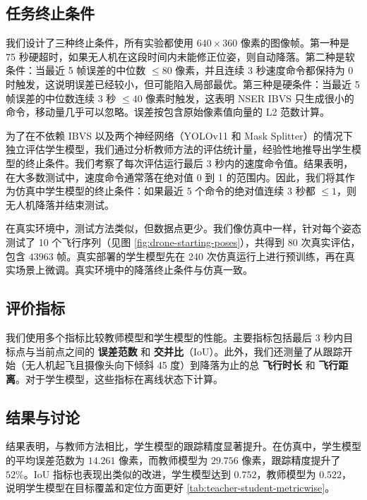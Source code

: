 \documentclass[10pt,twocolumn,letterpaper]{article}
\begin{document}
\subsection{任务终止条件}
\label{subsed:experiments-termination-conditions}
我们设计了三种终止条件，所有实验都使用 $640 \times 360$ 像素的图像帧。第一种是 75 秒硬超时，如果无人机在这段时间内未能修正位姿，则自动降落。第二种是软条件：当最近 5 帧误差的中位数 $\leq 80$ 像素，并且连续 3 秒速度命令都保持为 0 时触发，这说明误差已经较小，但可能陷入局部最优。第三种是硬条件：当最近 5 帧误差的中位数连续 3 秒 $\leq 40$ 像素时触发，这表明 NSER IBVS 只生成很小的命令，移动量几乎可以忽略。误差按包含原始像素值向量的 L2 范数计算。

为了在不依赖 IBVS 以及两个神经网络（YOLOv11 和 Mask Splitter）的情况下独立评估学生模型，我们通过分析教师方法的评估统计量，经验性地推导出学生模型的终止条件。我们考察了每次评估运行最后 3 秒内的速度命令值。结果表明，在大多数测试中，速度命令通常落在绝对值 0 到 1 的范围内。因此，我们将其作为仿真中学生模型的终止条件：如果最近 5 个命令的绝对值连续 3 秒都 $\leq 1$，则无人机降落并结束测试。

在真实环境中，测试方法类似，但数据点更少。我们像仿真中一样，针对每个姿态测试了 10 个飞行序列（见图 \ref{fig:drone-starting-poses}），共得到 80 次真实评估，包含 $43963$ 帧。真实部署的学生模型先在 240 次仿真运行上进行预训练，再在真实场景上微调。真实环境中的降落终止条件与仿真一致。

\subsection{评价指标}
\label{subsec:experiments-metrics}
我们使用多个指标比较教师模型和学生模型的性能。主要指标包括最后 3 秒内目标点与当前点之间的 \textbf{误差范数} 和 \textbf{交并比}（IoU）。此外，我们还测量了从跟踪开始（无人机起飞且摄像头向下倾斜 45 度）到降落为止的总 \textbf{飞行时长} 和 \textbf{飞行距离}。对于学生模型，这些指标在离线状态下计算。

\subsection{结果与讨论}
\label{sec:discussions-results}
结果表明，与教师方法相比，学生模型的跟踪精度显著提升。在仿真中，学生模型的平均误差范数为 $14.261$ 像素，而教师模型为 $29.756$ 像素，跟踪精度提升了 $52\%$。IoU 指标也表现出类似的改进，学生模型达到 $0.752$，教师模型为 $0.522$，说明学生模型在目标覆盖和定位方面更好 \ref{tab:teacher-student-metricwise}。
\end{document}
